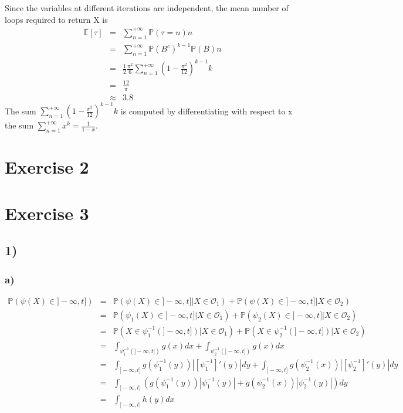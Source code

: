 Since the variables at different iterations are independent, the mean number of loops required to return X is 
\begin{eqnarray*}
	\mathbb{E}[\tau]&=&\sum_{n=1}^{+\infty}\mathbb{P}(\tau=n)n\\
	&=&\sum_{n=1}^{+\infty}\mathbb{P}(B^{c})^{k-1}\mathbb{P}(B)n\\
	&=&\frac{1}{2}\frac{\pi^{2}}{6}\sum_{n=1}^{+\infty}(1-\frac{\pi^{2}}{12})^{k-1}k\\
	&=&\frac{12}{\pi}\\
	&\approx& 3.8
\end{eqnarray*}
The sum $\sum_{n=1}^{+\infty}(1-\frac{\pi^{2}}{12})^{k-1}k$ is computed by differentiating with respect to x the sum $\sum_{n=1}^{+\infty}x^{k}=\frac{1}{1-x}$.



\section*{Exercise 2}

\section*{Exercise 3}
\subsection*{1)}
\subsubsection*{a)}

\begin{eqnarray*}
\mathbb{P}(\psi(X) \in ]-\infty,t]) &=& \mathbb{P}(\psi(X) \in ]-\infty,t] | X \in \mathcal{O}_1) + \mathbb{P}(\psi(X) \in ]-\infty,t] | X \in \mathcal{O}_2)\\
	&=& \mathbb{P}(\psi_1(X) \in ]-\infty,t] | X \in \mathcal{O}_1) + \mathbb{P}(\psi_2(X) \in ]-\infty,t] | X \in \mathcal{O}_2)\\
&=& \mathbb{P}(X \in \psi_1^{-1}(]-\infty,t]) | X \in \mathcal{O}_1) + \mathbb{P}(X \in \psi_2^{-1}(]-\infty,t]) | X \in \mathcal{O}_2)\\
	&=& \int_{\psi_1^{-1}(]-\infty,t])} g(x) dx + \int_{\psi_2^{-1}(]-\infty,t])} g(x) dx\\
&=& \int_{]-\infty,t]} g(\psi_1^{-1}(y)) |[\psi_1^{-1}]'(y)|dy + \int_{]-\infty,t]} g(\psi_2^{-1}(x)) |[\psi_2^{-1}]'(y)|dy\\
	&=& \int_{]-\infty,t]} \left(g(\psi_1^{-1}(y)) |\psi_1^{-1}(y)| + g(\psi_2^{-1}(x)) |\psi_2^{-1}(y)|\right) dy\\
	&=& \int_{]-\infty,t]} h(y) dx
\end{eqnarray*}

